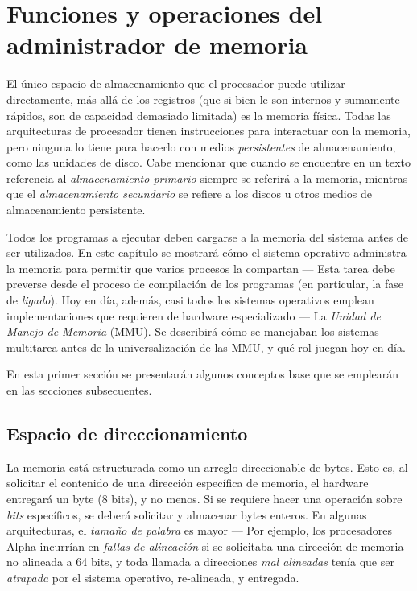 \documentclass[11pt,fleqn]{book} %
\begin{document}
\section{Funciones y operaciones del administrador de memoria}
\label{sec-5-1}
\label{MEM}

El único espacio de almacenamiento que el procesador puede utilizar
directamente, más allá de los registros (que si bien le son internos y
sumamente rápidos, son de capacidad demasiado limitada) es la memoria
física. Todas las arquitecturas de procesador tienen instrucciones
para interactuar con la memoria, pero ninguna lo tiene para hacerlo
con medios \emph{persistentes} de almacenamiento, como las unidades de
disco. Cabe mencionar que cuando se encuentre en un texto
referencia al \emph{almacenamiento primario} siempre se referirá a la
memoria, mientras que el \emph{almacenamiento secundario} se refiere a los
discos u otros medios de almacenamiento persistente.

Todos los programas a ejecutar deben cargarse a la memoria
del sistema antes de ser utilizados. En este capítulo se mostrará cómo
el sistema operativo administra la memoria para permitir que varios
procesos la compartan — Esta tarea debe preverse desde el proceso de
compilación de los programas (en particular, la fase de
\emph{ligado}). Hoy en día, además, casi todos los sistemas operativos
emplean implementaciones que requieren de hardware especializado — La
\emph{Unidad de Manejo de Memoria} (MMU). Se describirá cómo se manejaban
los sistemas multitarea antes de la universalización de las MMU, y qué
rol juegan hoy en día.

En esta primer sección se presentarán algunos conceptos base que 
se emplearán en las secciones subsecuentes.
\subsection{Espacio de direccionamiento}
\label{sec-5-1-1}


La memoria está estructurada como un arreglo direccionable de
bytes. Esto es, al solicitar el contenido de una dirección
específica de memoria, el hardware entregará un byte (8 bits), y
no menos. Si se requiere hacer una operación sobre \emph{bits} específicos,
se deberá solicitar y almacenar bytes enteros. En algunas
arquitecturas, el \emph{tamaño de palabra} es mayor — Por ejemplo, los
procesadores Alpha incurrían en \emph{fallas de alineación} si se
solicitaba una dirección de memoria no alineada a 64 bits, y toda
llamada a direcciones \emph{mal alineadas} tenía que ser \emph{atrapada} por el
sistema operativo, re-alineada, y entregada.
\end{document}
